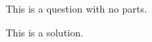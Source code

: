 \begin{question}
	This is a question with no parts.
\end{question}

\begin{solution}
	This is a solution.
\end{solution}